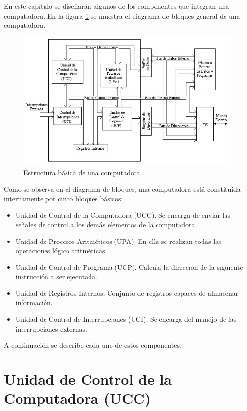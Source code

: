 \documentclass[12pt]{book}
\theoremstyle{definition}
\theoremstyle{remark}
\theoremstyle{plain}
\begin{document}
En este capítulo se diseñarán algunos de los componentes que integran una computadora. En la
figura \ref{fig29} se muestra el diagrama de bloques general de una computadora.

\begin{figure}
\centering
\includegraphics[width=5in]{computerbasica.jpg}
\caption{Estructura básica de una computadora.}
\label{fig29}
\end{figure}

Como se observa en el diagrama de bloques, una computadora está constituida internamente por
cinco bloques básicos:

\begin{itemize}
\item Unidad de Control de la Computadora (UCC). Se encarga de enviar las señales de control a
los demás elementos de la computadora.
\item Unidad de Procesos Aritméticos (UPA). En ella se realizan todas las operaciones lógico
aritméticas.
\item Unidad de Control de Programa (UCP). Calcula la dirección de la siguiente instrucción a ser
ejecutada.
\item Unidad de Registros Internos. Conjunto de registros capaces de almacenar información.
\item Unidad de Control de Interrupciones (UCI). Se encarga del manejo de las interrupciones
externas.
\end{itemize}

A continuación se describe cada uno de estos componentes.

\section{Unidad de Control de la Computadora (UCC)}
\end{document}
